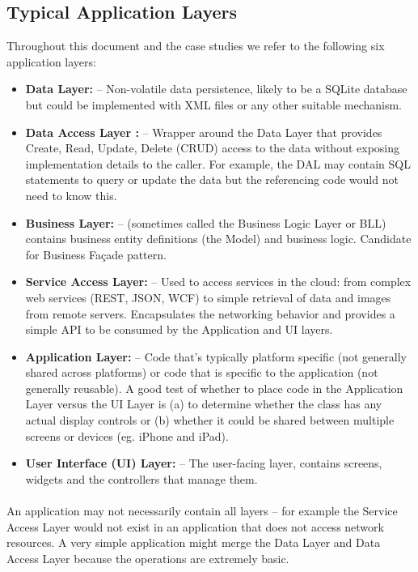 \subsection{Typical Application Layers}


Throughout this document and the case studies we refer to the following six application layers:

\begin{itemize}
\item \textbf{Data Layer:}  – Non-volatile data persistence, likely to be a SQLite database but could be implemented with XML files or any other suitable mechanism.
\item \textbf{ Data Access Layer :} – Wrapper around the Data Layer that provides Create, Read, Update, Delete (CRUD) access to the data without exposing implementation details to the caller. For example, the DAL may contain SQL statements to query or update the data but the referencing code would not need to know this.
\item \textbf{ Business Layer:}  – (sometimes called the Business Logic Layer or BLL) contains business entity definitions (the Model) and business logic. Candidate for Business Façade pattern.
\item \textbf{Service Access Layer:}  – Used to access services in the cloud: from complex web services (REST, JSON, WCF) to simple retrieval of data and images from remote servers. Encapsulates the networking behavior and provides a simple API to be consumed by the Application and UI layers.
\item \textbf{ Application Layer:}  – Code that’s typically platform specific (not generally shared across platforms) or code that is specific to the application (not generally reusable). A good test of whether to place code in the Application Layer versus the UI Layer is (a) to determine whether the class has any actual display controls or (b) whether it could be shared between multiple screens or devices (eg. iPhone and iPad).
\item \textbf{ User Interface (UI) Layer:}  – The user-facing layer, contains screens, widgets and the controllers that manage them.

\end{itemize}

\paragraph{}
An application may not necessarily contain all layers – for example the Service Access Layer would not exist in an application that does not access network resources. A very simple application might merge the Data Layer and Data Access Layer because the operations are extremely basic.



